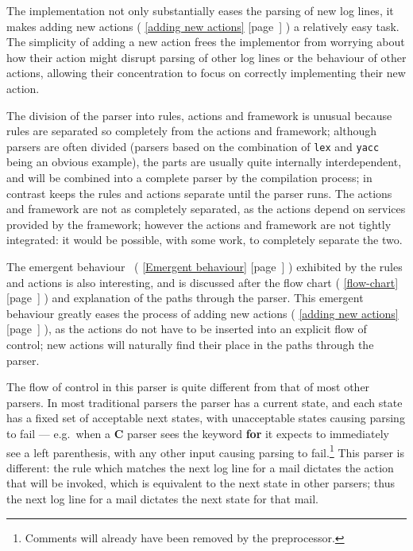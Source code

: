 \documentclass[a4paper,12pt,draft]{article}
\newcommand{\parsername}{\PLP{}}
\newcommand{\refwithpage}[1]{%
    \empty{}\ref{#1} [page~\pageref{#1}]%
}
\newcommand{\sectionref}[1]{%
    \textsection{}\refwithpage{#1}%
}
\begin{document}
The implementation not only substantially eases the parsing of new log
lines, it makes adding new actions (\sectionref{adding new actions}) a
relatively easy task.  The simplicity of adding a new action frees the
implementor from worrying about how their action might disrupt parsing of
other log lines or the behaviour of other actions, allowing their
concentration to focus on correctly implementing their new action.


The division of the parser into rules, actions and framework is unusual
because rules are separated so completely from the actions and framework;
although parsers are often divided (parsers based on the combination of
\texttt{lex} and \texttt{yacc}~\cite{lex-and-yacc} 
being an obvious example), the parts are usually quite internally
interdependent, and will be combined into a complete parser by the
compilation process; in contrast \parsername{} keeps the rules and actions
separate until the parser runs.  The actions and framework are not as
completely separated, as the actions depend on services provided by the
framework; however the actions and framework are not tightly integrated: it
would be possible, with some work, to completely separate the two.


The emergent behaviour~\cite{Wikipedia-Emergence} (\sectionref{Emergent
behaviour}) exhibited by the rules and actions is also interesting, and is
discussed after the flow chart (\sectionref{flow-chart}) and explanation of
the paths through the parser.  This emergent behaviour greatly eases the
process of adding new actions (\sectionref{adding new actions}), as the
actions do not have to be inserted into an explicit flow of control; new
actions will naturally find their place in the paths through the parser.

The flow of control in this parser is quite different from that of most
other parsers.  In most traditional parsers the parser has a current state,
and each state has a fixed set of acceptable next states, with unacceptable
states causing parsing to fail --- e.g.\ when a \textbf{C} parser sees the
keyword \textbf{for} it expects to immediately see a left parenthesis, with
any other input causing parsing to fail.\footnote{Comments will already
have been removed by the preprocessor.}  This parser is different: the
rule which matches the next log line for a mail dictates the action that
will be invoked, which is equivalent to the next state in other parsers;
thus the next log line for a mail dictates the next state for that mail.
\end{document}

